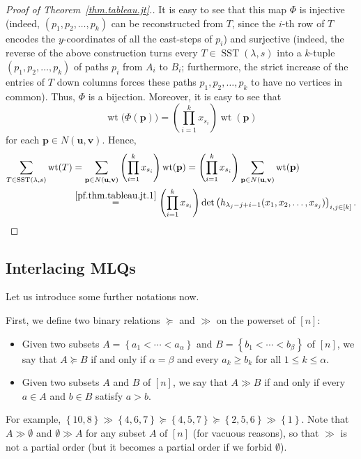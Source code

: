 \documentclass[reqno]{amsart}
\newcommand{\0}{\phantom{c}}
\DeclareMathOperator{\wt}{wt} %
\DeclareMathOperator{\SST}{SST} %
\newcommand{\pp}{\mathbf{p}}
\newcommand{\uu}{\mathbf{u}}
\newcommand{\vv}{\mathbf{v}}
\let\sumnonlimits\sum
\let\prodnonlimits\prod
\renewcommand{\sum}{\sumnonlimits\limits}
\renewcommand{\prod}{\prodnonlimits\limits}
\newcommand{\set}[1]{\left\{ #1 \right\}}
\newcommand{\ive}[1]{\left[ #1 \right]}
\newcommand{\defn}[1]{{\color{darkred}\emph{#1}}} %
\theoremstyle{plain}
\theoremstyle{definition}
\numberwithin{equation}{section}
\newcommand{\darij}[1]{\todo[size=\tiny,color=red!30]{#1 \\ \hfill --- Darij}}
\newcommand{\Darij}[1]{\todo[size=\tiny,inline,color=red!30]{#1
      \\ \hfill --- Darij}}
\newcommand{\travis}[1]{\todo[size=\tiny,color=blue!30]{#1 \\ \hfill --- Travis}}
\begin{document}
\begin{proof}[Proof of Theorem~\ref{thm.tableau.jt}.]
It is easy to see that this map $\Phi$ is injective (indeed, $\left(
p_1,p_2,\ldots,p_k\right)  $ can be reconstructed from $T$, since the
$i$-th row of $T$ encodes the $y$-coordinates of all the east-steps of $p_i$)
and surjective (indeed, the reverse of the above construction turns every
$T \in \SST(\lambda, s)$ into a $k$-tuple
$\left(  p_1,p_2,\ldots,p_k\right)  $ of paths $p_i$ from $A_i$ to
$B_i$; furthermore, the strict increase of the entries of $T$ down columns
forces these paths $p_1,p_2,\ldots,p_k$ to have no vertices in common).
Thus, $\Phi$ is a bijection.
Moreover, it is easy to see that
\[
\wt\bigl(  \Phi(\pp) \bigr) = \left( \prod_{i=1}^k x_{s_i} \right) \wt(\pp)
\]
for each $\pp \in N(\uu,\vv)$.
Hence,
\begin{align*}
\sum_{T \in \SST(\lambda, s)} \wt(T)  &  = \sum_{\pp\in N(\uu,\vv)  }\left( \prod_{i=1}^k x_{s_i} \right)  \wt(\pp)
= \left( \prod_{i=1}^k x_{s_i} \right) \sum_{\pp\in N(\uu,\vv)  } \wt(\pp) \\
&  \overset{\eqref{pf.thm.tableau.jt.1}}{=} \left(  \prod_{i=1}^k x_{s_i} \right)  \det\left( h_{\lambda_j-j+i-1}(x_1, x_2, \dotsc, x_{s_j}) \right)_{i, j \in \ive{k}}.
\end{align*}
\end{proof}

\Darij{TODO: Example.}


\subsection{Interlacing MLQs}

Let us introduce some further notations now.

First, we define two binary relations $\succeq$ and $\gg$ on the powerset of $\ive{n}$:

\begin{itemize}
\item Given two subsets $A = \set{a_1 < \cdots < a_{\alpha}} $ and $B = \set{b_1 < \cdots < b_{\beta}}$ of $\ive{n}$, we say that \defn{$A\succeq B$} if and only if $\alpha =\beta$ and every $a_k \geq b_k$ for all $1 \leq k \leq \alpha$.

\item Given two subsets $A$ and $B$ of $\ive{n}$, we say that \defn{$A \gg B$} if and only if every $a \in A$ and $b \in B$ satisfy $a > b$.
\end{itemize}

For example, $\set{10,8} \gg \set{4,6,7} \succeq \set{4,5,7} \succeq \set{2,5,6}  \gg \set{1}$.
Note that $A \gg \emptyset$ and $\emptyset \gg A$ for any subset $A$ of $\ive{n}$ (for vacuous reasons), so that $\gg$ is not a partial order (but it becomes a partial order if we forbid $\emptyset$).
\end{document}
